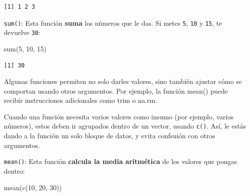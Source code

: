 \documentclass[
  letterpaper,
  DIV=11,
  numbers=noendperiod,
  twoside]{scrreprt}
\newenvironment{Shaded}{\begin{snugshade}}{\end{snugshade}}
\newcommand{\DecValTok}[1]{\textcolor[rgb]{0.68,0.00,0.00}{#1}}
\newcommand{\FunctionTok}[1]{\textcolor[rgb]{0.28,0.35,0.67}{#1}}
\newcommand{\NormalTok}[1]{\textcolor[rgb]{0.00,0.23,0.31}{#1}}
\begin{document}
\begin{verbatim}
[1] 1 2 3
\end{verbatim}

\texttt{sum()}: Esta función \textbf{suma} los números que le das. Si
metes \texttt{5}, \texttt{10} y \texttt{15}, te devuelve \texttt{30}:

\begin{Shaded}
\begin{Highlighting}[]
\FunctionTok{sum}\NormalTok{(}\DecValTok{5}\NormalTok{, }\DecValTok{10}\NormalTok{, }\DecValTok{15}\NormalTok{)  }
\end{Highlighting}
\end{Shaded}

\begin{verbatim}
[1] 30
\end{verbatim}

Algunas funciones permiten no solo darles valores, sino también ajustar
cómo se comportan usando otros argumentos. Por ejemplo, la función
mean() puede recibir instrucciones adicionales como trim o na.rm.

\begin{tcolorbox}[enhanced jigsaw, titlerule=0mm, title=\textcolor{quarto-callout-tip-color}{\faLightbulb}\hspace{0.5em}{Consejo}, colback=white, opacityback=0, breakable, toprule=.15mm, left=2mm, leftrule=.75mm, colframe=quarto-callout-tip-color-frame, bottomtitle=1mm, rightrule=.15mm, opacitybacktitle=0.6, coltitle=black, arc=.35mm, bottomrule=.15mm, toptitle=1mm, colbacktitle=quarto-callout-tip-color!10!white]

Cuando una función necesita varios valores como insumo (por ejemplo,
varios números), estos deben ir agrupados dentro de un vector, usando
\texttt{c()}. Así, le estás dando a la función un solo bloque de datos,
y evita confsuión con otros argumentos.

\end{tcolorbox}

\texttt{mean()}: Esta función \textbf{calcula la media aritmética} de
los valores que pongas dentro:

\begin{Shaded}
\begin{Highlighting}[]
\FunctionTok{mean}\NormalTok{(}\FunctionTok{c}\NormalTok{(}\DecValTok{10}\NormalTok{, }\DecValTok{20}\NormalTok{, }\DecValTok{30}\NormalTok{)) }
\end{Highlighting}
\end{Shaded}
\end{document}
